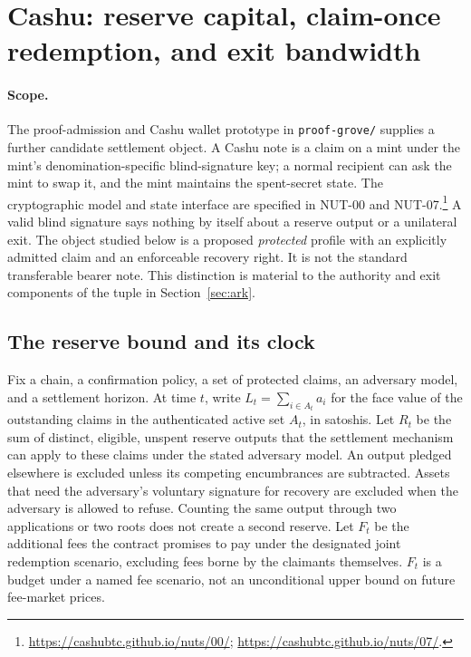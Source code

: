 \section{Cashu: reserve capital, claim-once redemption, and exit bandwidth}
\label{app:cashu-capital}
\paragraph{Scope.}
The proof-admission and Cashu wallet prototype in \texttt{proof-grove/} supplies a further candidate settlement object. A Cashu note is a claim on a mint under the mint's denomination-specific blind-signature key; a normal recipient can ask the mint to swap it, and the mint maintains the spent-secret state. The cryptographic model and state interface are specified in NUT-00 and NUT-07.\footnote{\url{https://cashubtc.github.io/nuts/00/}; \url{https://cashubtc.github.io/nuts/07/}.} A valid blind signature says nothing by itself about a reserve output or a unilateral exit. The object studied below is a proposed \emph{protected} profile with an explicitly admitted claim and an enforceable recovery right. It is not the standard transferable bearer note. This distinction is material to the authority and exit components of the tuple in Section~\ref{sec:ark}.

\subsection{The reserve bound and its clock}

Fix a chain, a confirmation policy, a set of protected claims, an adversary model, and a settlement horizon. At time $t$, write $L_t=\sum_{i\in A_t}a_i$ for the face value of the outstanding claims in the authenticated active set $A_t$, in satoshis. Let $R_t$ be the sum of distinct, eligible, unspent reserve outputs that the settlement mechanism can apply to these claims under the stated adversary model. An output pledged elsewhere is excluded unless its competing encumbrances are subtracted. Assets that need the adversary's voluntary signature for recovery are excluded when the adversary is allowed to refuse. Counting the same output through two applications or two roots does not create a second reserve. Let $F_t$ be the additional fees the contract promises to pay under the designated joint redemption scenario, excluding fees borne by the claimants themselves. $F_t$ is a budget under a named fee scenario, not an unconditional upper bound on future fee-market prices.

